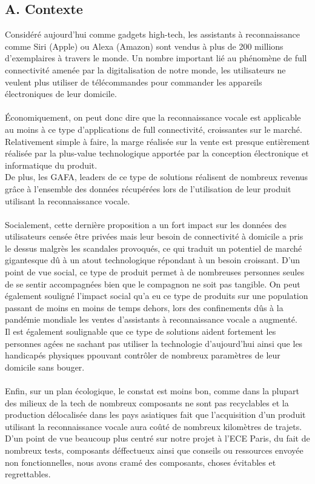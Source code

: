 \documentclass[a4paper,11pt]{book}
\begin{document}
\subsection*{A. Contexte}
Considéré aujourd'hui comme gadgets high-tech, les assistants à reconnaissance comme Siri (Apple) ou Alexa (Amazon) sont vendus à plus de 200 millions d'exemplaires à travers le monde. Un nombre important lié au phénomène de full connectivité amenée par la digitalisation de notre monde, les utilisateurs ne veulent plus utiliser de télécommandes pour commander les appareils électroniques de leur domicile. \\ \\
Économiquement, on peut donc dire que la reconnaissance vocale est applicable au moins à ce type d'applications de full connectivité, croissantes sur le marché. Relativement simple à faire, la marge réalisée sur la vente est presque entièrement réalisée par la plus-value technologique apportée par la conception électronique et informatique du produit. \\ 
De plus, les GAFA, leaders de ce type de solutions réalisent de nombreux revenus grâce à l'ensemble des données récupérées lors de l'utilisation de leur produit utilisant la reconnaissance vocale. \\ \\

Socialement, cette dernière proposition a un fort impact sur les données des utilisateurs censée être privées mais leur besoin de connectivité à domicile a pris le dessus malgrès les scandales provoqués, ce qui traduit un potentiel de marché gigantesque dû à un atout technologique répondant à un besoin croissant. D'un point de vue social, ce type de produit permet à de nombreuses personnes seules de se sentir accompagnées bien que le compagnon ne soit pas tangible. On peut également souligné l'impact social qu'a eu ce type de produits sur une population passant de moins en moins de temps dehors, lors des confinements dûs à la pandémie mondiale les ventes d'assistants à reconnaissance vocale a augmenté. \\ 
Il est également soulignable que ce type de solutions aident fortement les personnes agées ne sachant pas utiliser la technologie d'aujourd'hui ainsi que les handicapés physiques ppouvant contrôler de nombreux paramètres de leur domicile sans bouger.\\ \\

Enfin, sur un plan écologique, le constat est moins bon, comme dans la plupart des milieux de la tech de nombreux composants ne sont pas recyclables et la production délocalisée dans les pays asiatiques fait que l'acquisition d'un produit utilisant la reconnaissance vocale aura coûté de nombreux kilomètres de trajets. D'un point de vue beaucoup plus centré sur notre projet à l'ECE Paris, du fait de nombreux tests, composants déffectueux ainsi que conseils ou ressources envoyée non fonctionnelles, nous avons cramé des composants, choses évitables et regrettables.\\ \\ \\ \\ \\
\end{document}
